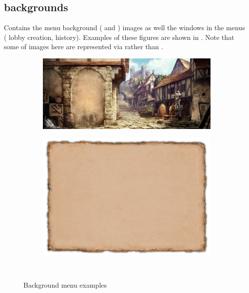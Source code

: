 \begin{appendices}
    \subsection{backgrounds}

    Contains the menu background ( and ) images as well the windows in the \aoe{} menus (\eg{} lobby creation, history). Examples of these figures are shown in . Note that some of images here are represented via  rather than .

    \begin{figure}
        \centering
        \begin{subfigure}{0.48\textwidth}
            \centering
            \includegraphics[width=1.0\textwidth]{src/images/mainmenu-bg}
        \end{subfigure}\quad%
        \begin{subfigure}{0.48\textwidth}
            \centering
            \includegraphics[width=1.0\textwidth]{src/images/popup-menu-bg}
        \end{subfigure}\\%
        \caption{Background menu examples}
        \label{fig:backgrounds}
    \end{figure}


\end{appendices}
